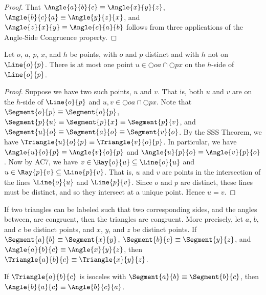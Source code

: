 \documentclass{article}
\begin{document}
\begin{proof}
That $\Angle{a}{b}{c} \equiv \Angle{x}{y}{z}$, $\Angle{b}{c}{a} \equiv \Angle{y}{z}{x}$, and $\Angle{z}{x}{y} \equiv \Angle{c}{a}{b}$ follows from three applications of the Angle-Side Congruence property.
\end{proof}

\begin{prop}
Let $o$, $a$, $p$, $x$, and $h$ be points, with $o$ and $p$ distinct and with $h$ not on $\Line{o}{p}$. There is at most one point $u \in \Circle{o}{a} \cap \Circle{p}{x}$ on the $h$-side of $\Line{o}{p}$.
\end{prop}

\begin{proof}
Suppose we have two such points, $u$ and $v$. That is, both $u$ and $v$ are on the $h$-side of $\Line{o}{p}$ and $u,v \in \Circle{o}{a} \cap \Circle{p}{x}$. Note that $\Segment{o}{p} \equiv \Segment{o}{p}$, $\Segment{p}{u} \equiv \Segment{p}{x} \equiv \Segment{p}{v}$, and $\Segment{u}{o} \equiv \Segment{a}{o} \equiv \Segment{v}{o}$. By the SSS Theorem, we have $\Triangle{u}{o}{p} \equiv \Triangle{v}{o}{p}$. In particular, we have $\Angle{u}{o}{p} \equiv \Angle{v}{o}{p}$ and $\Angle{u}{p}{o} \equiv \Angle{v}{p}{o}$. Now by AC7, we have $v \in \Ray{o}{u} \subseteq \Line{o}{u}$ and $u \in \Ray{p}{v} \subseteq \Line{p}{v}$. That is, $u$ and $v$ are points in the intersection of the lines $\Line{o}{u}$ and $\Line{p}{v}$. Since $o$ and $p$ are distinct, these lines must be distinct, and so they intersect at a unique point. Hence $u = v$.
\end{proof}

\begin{prop}
If two triangles can be labeled such that two corresponding sides, and the angles between, are congruent, then the triangles are congruent. More precisely, let $a$, $b$, and $c$ be distinct points, and $x$, $y$, and $z$ be distinct points. If $\Segment{a}{b} \equiv \Segment{x}{y}$, $\Segment{b}{c} \equiv \Segment{y}{z}$, and $\Angle{a}{b}{c} \equiv \Angle{x}{y}{z}$, then $\Triangle{a}{b}{c} \equiv \Triangle{x}{y}{z}$.
\end{prop}

\begin{prop}
If $\Triangle{a}{b}{c}$ is isoceles with $\Segment{a}{b} \equiv \Segment{b}{c}$, then $\Angle{b}{a}{c} \equiv \Angle{b}{c}{a}$.
\end{prop}
\end{document}
